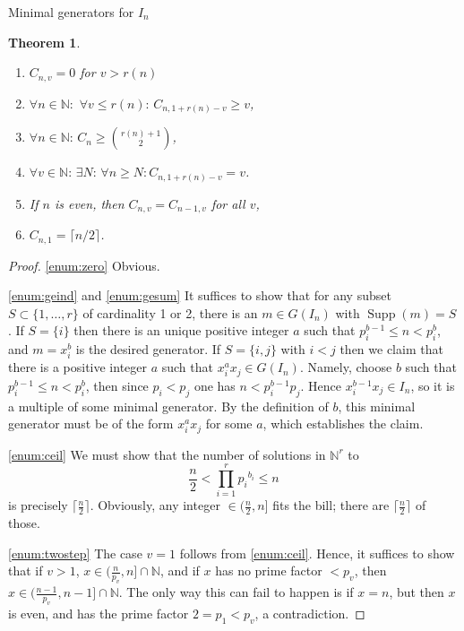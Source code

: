 \documentclass[reqno,10pt]{amsart}
\theoremstyle{definition}
\theoremstyle{remark}
\theoremstyle{plain}
\newtheorem{thm}[definition]{Theorem}
\newcommand{\Nat}{{\mathbb{N}}}
\newcommand{\set}[1]{{\{#1\}}}
\newcommand{\supp}{\operatorname*{Supp}}
\begin{document}
\begin{section}{Minimal generators for \(I_n\)}
  \begin{thm} \label{thm:bc}
    \begin{enumerate}[(1)]
    \item \label{enum:zero}
      \(C_{n,v}=0\) for \(v > r(n)\)
    \item \label{enum:geind}
      \(\forall n \in \Nat: \, \, \forall v \le r(n): \,
      C_{n,1+r(n)-v} \ge v\), 
    \item \label{enum:gesum}
      \(\forall n \in \Nat: \, C_n \ge \binom{r(n)+1}{2}\),
    \item \label{enum:lintail}
      \(\forall v \in \Nat: \, \exists N: \, \forall n \ge N:
      C_{n,1+r(n)-v} = v\).
    \item \label{enum:twostep}
      If \(n\) is even, then \(C_{n,v}=C_{n-1,v}\) for all \(v\), 
    \item \label{enum:ceil}
      \(C_{n,1} = \lceil n/2 \rceil\).
    \end{enumerate}
  \end{thm}
  \begin{proof}
    \eqref{enum:zero} Obvious. 
    
    \eqref{enum:geind}  and \eqref{enum:gesum}
    It suffices to show that for any subset \(S \subset
    \set{1,\dots,r}\) 
    of cardinality 1 or 2, there is an \(m \in G(I_n)\) with
    \(\supp(m)=S\). If \(S=\set{i}\) then there is an unique positive
    integer \(a\) such that \(p_i^{b-1} \le n < p_i^b\), and
    \(m=x_i^b\) is the desired generator. If \(S=\set{i,j}\) with \(i
    < j\) then we claim that there is a positive integer \(a\) such that
    \(x_i^a x_j \in G(I_n)\). Namely, choose \(b\) such that 
    \(p_i^{b-1} \leq n < p_i^b\), then since \(p_i < p_j\) one has \(n <
    p_i^{b-1} p_j\). Hence \(x_i^{b-1}x_j \in I_n\), so it is a multiple of
    some minimal generator. By the definition of \(b\), this minimal generator 
    must be of the form \(x_i^ax_j\) for some \(a\), which establishes the
    claim. 

    \eqref{enum:ceil} We must show that the number of
    solutions in \(\Nat^r\) to 
    \begin{displaymath}
      \frac{n}{2} < \prod_{i=1}^r {p_i}^{b_i} \le n
    \end{displaymath}
    is precisely \(\lceil \frac{n}{2} \rceil\). 
    Obviously, any integer \(\in (\frac{n}{2}, n]\) fits the bill;
    there are \(\lceil \frac{n}{2} \rceil\) of those.
    
    \eqref{enum:twostep} The case \(v=1\) follows from
    \eqref{enum:ceil}. Hence, it suffices to show that if \(v>1\), 
    \(x \in (\frac{n}{p_v}, n] \cap \Nat\), and if \(x\) has no prime
    factor \(< p_v\), then \(x \in (\frac{n-1}{p_v}, n-1] \cap
    \Nat\). The only way this can fail to happen is if \(x=n\), but
    then \(x\) is even, and has the prime factor \(2=p_1 < p_v\), a
    contradiction. 
    

\end{proof}
\end{section}
\end{document}
